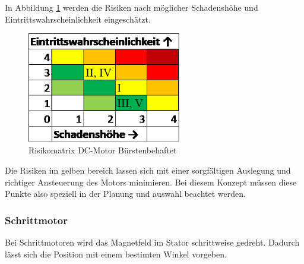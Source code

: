 \documentclass[../../main.tex]{subfiles}
\begin{document}
    In Abbildung \ref{fig:antr_risikomatrix_buerstenbehaftet} werden die Risiken nach möglicher Schadenshöhe und Eintrittswahrscheinlichkeit eingeschätzt.

    \begin{figure}[H]
        \centering
        \includegraphics[width=0.6\textwidth]{Antr_Risiko_DCMotor_Buerstenbehaftet.png}
        \caption {Risikomatrix DC-Motor Bürstenbehaftet}
        \label{fig:antr_risikomatrix_buerstenbehaftet}
    \end{figure}

    Die Risiken im gelben bereich lassen sich mit einer sorgfältigen Auslegung und richtiger Ansteuerung des Motors minimieren. Bei diesem Konzept müssen diese Punkte also speziell in der Planung und auswahl beachtet werden. 

    \subsubsection{Schrittmotor}
    Bei Schrittmotoren wird das Magnetfeld im Stator schrittweise gedreht. Dadurch lässt sich die Position mit einem bestimten Winkel vorgeben.
\end{document}
